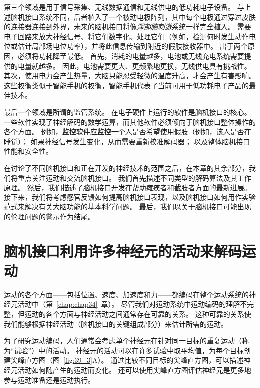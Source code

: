 第三个领域是用于信号采集、无线数据通信和无线供电的低功耗电子设备。
与上述脑机接口系统不同，后者植入了一个被动电极阵列，其中每个电极通过穿过皮肤的连接器连接到外界，未来的脑机接口将像\textit{深部脑刺激}系统一样完全植入。
需要电子回路来放大神经信号、将它们数字化、处理它们（例如，检测何时发生动作电位或估计局部场电位功率），并将此信息传输到附近的假肢接收器中。
出于两个原因，必须将功耗降至最低。
首先，消耗的电量越多，电池或无线充电系统需要提供的电量就越多。
因此，电池需要更大、更频繁地更换，无线供电具有挑战性。
其次，使用电力会产生热量，大脑只能忍受轻微的温度升高，才会产生有害影响。
这些权衡类似于智能手机的权衡，智能手机代表了当前可用于低功耗电子产品的最佳技术。


最后一个领域是所谓的监管系统。
在电子硬件上运行的软件是脑机接口的核心。 
一些软件实现了神经解码的数学运算，而其他软件必须倾向于脑机接口整体操作的各个方面。
例如，监控软件应监控一个人是否希望使用假肢（例如，该人是否在睡觉）；
如果神经信号发生变化，从而需要重新校准解码器；
以及整体脑机接口性能和安全性。


在讨论了不同脑机接口和正在开发的神经技术的范围之后，在本章的其余部分，我们将重点关注运动和交流脑机接口。 
我们首先描述不同类型的解码算法及其工作原理。
然后，我们描述了脑机接口开发在帮助瘫痪者和截肢者方面的最新进展。 
接下来，我们将考虑感官反馈如何提高脑机接口表现，以及脑机接口如何用作实验范式来解决有关大脑功能的基本科学问题。
最后，我们以关于脑机接口可能出现的伦理问题的警示作为结尾。



\section{脑机接口利用许多神经元的活动来解码运动}

运动的各个方面——包括位置、速度、加速度和力——都编码在整个运动系统的神经元活动中（第~\ref{chap:chap34}~章）。
尽管我们对运动系统中运动编码的理解不完整，但运动的各个方面与神经活动之间通常存在可靠的关系。
这种可靠的关系使我们能够根据神经活动（脑机接口的关键组成部分）来估计所需的运动。


为了研究运动编码，人们通常会考虑单个神经元在针对同一目标的重复运动（称为“试验”）中的活动。
神经元的活动可以在许多试验中取平均值，为每个目标创建尖峰直方图（图~\ref{fig:39_3}A）。
通过比较不同目标的尖峰直方图，可以描述神经元活动如何随产生的运动而变化。
还可以使用尖峰直方图评估神经元是更多地参与运动准备还是运动执行。


